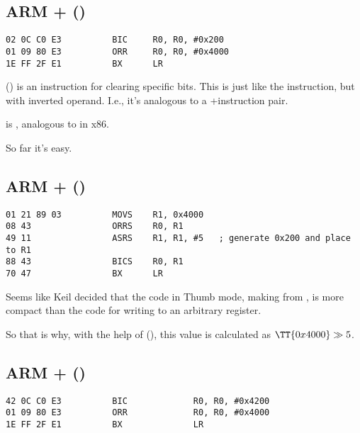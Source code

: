 \subsection{ARM + \OptimizingKeilVI (\ARMMode)}

\begin{lstlisting}[caption=\OptimizingKeilVI (\ARMMode)]
02 0C C0 E3          BIC     R0, R0, #0x200
01 09 80 E3          ORR     R0, R0, #0x4000
1E FF 2F E1          BX      LR
\end{lstlisting}

 () is an instruction for clearing 
specific bits. This is just like the \AND instruction, but with inverted operand.
I.e., it's analogous to a \NOT+\AND instruction pair.

 is , analogous to \OR in x86.

So far it's easy.

\subsection{ARM + \OptimizingKeilVI (\ThumbMode)}

\begin{lstlisting}[caption=\OptimizingKeilVI (\ThumbMode)]
01 21 89 03          MOVS    R1, 0x4000
08 43                ORRS    R0, R1
49 11                ASRS    R1, R1, #5   ; generate 0x200 and place to R1
88 43                BICS    R0, R1
70 47                BX      LR
\end{lstlisting}

Seems like Keil decided that the code in Thumb mode,
making  from , 
is more compact than the code 
for writing  to an arbitrary register.


So that is why, with the help of  (\ASRdesc), this value is calculated as $\TT{0x4000} \gg 5$.

\subsection{ARM + \OptimizingXcodeIV (\ARMMode)}
\label{anomaly:LLVM}
\myindex{\CompilerAnomaly}

\begin{lstlisting}[caption=\OptimizingXcodeIV (\ARMMode),label=ARM_leaf_example3]
42 0C C0 E3          BIC             R0, R0, #0x4200
01 09 80 E3          ORR             R0, R0, #0x4000
1E FF 2F E1          BX              LR
\end{lstlisting}

